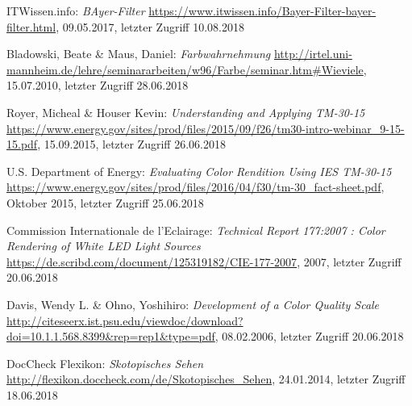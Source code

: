 
\listoffigures %
\listoftables %


\begin{thebibliography}{}


ITWissen.info:
\emph{\glqq BAyer-Filter\grqq}
\url{https://www.itwissen.info/Bayer-Filter-bayer-filter.html}, 09.05.2017, letzter Zugriff 10.08.2018

Bladowski, Beate \& Maus, Daniel:
\emph{\glqq Farbwahrnehmung\grqq}
\url{http://irtel.uni-mannheim.de/lehre/seminararbeiten/w96/Farbe/seminar.htm#Wieviele}, 15.07.2010, letzter Zugriff 28.06.2018

Royer, Micheal \& Houser Kevin:
\emph{\glqq Understanding and Applying TM-30-15\grqq}
\url{https://www.energy.gov/sites/prod/files/2015/09/f26/tm30-intro-webinar_9-15-15.pdf}, 15.09.2015, letzter Zugriff 26.06.2018

U.S. Department of Energy:
\emph{\glqq Evaluating Color Rendition Using IES TM-30-15\grqq}
\url{https://www.energy.gov/sites/prod/files/2016/04/f30/tm-30_fact-sheet.pdf}, Oktober 2015, letzter Zugriff 25.06.2018

Commission Internationale de l'Eclairage:
\emph{\glqq Technical Report 177:2007 : Color Rendering of White LED Light Sources\grqq}
\url{https://de.scribd.com/document/125319182/CIE-177-2007}, 2007, letzter Zugriff 20.06.2018

Davis, Wendy L. \& Ohno, Yoshihiro:
\emph{\glqq Development of a Color Quality Scale\grqq}
\url{http://citeseerx.ist.psu.edu/viewdoc/download?doi=10.1.1.568.8399&rep=rep1&type=pdf}, 08.02.2006, letzter Zugriff 20.06.2018

DocCheck Flexikon:
\emph{\glqq Skotopisches Sehen\grqq}
\url{http://flexikon.doccheck.com/de/Skotopisches_Sehen}, 24.01.2014, letzter Zugriff 18.06.2018


\end{thebibliography}
